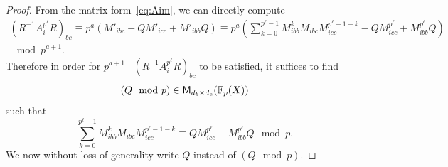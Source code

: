 \documentclass[letterpaper, 11pt, thm-restate]{article}
\numberwithin{equation}{section}
\newcommand{\F}{\mathbb{F}}
\newcommand{\M}{\mathsf{M}}
\newcommand{\oX}{\mkern 1.5mu\overline{\mkern-1.5mu X \mkern-1.5mu}\mkern 1.5mu}
\theoremstyle{definition}
\theoremstyle{definition}
\theoremstyle{definition}
\begin{document}
\begin{proof}
    From the matrix form~\eqref{eq:Aim}, we can directly compute
    \begin{multline*}
    \left(R^{-1} A_i^{p^{\ell}} R\right)_{bc} \equiv p^a\left(M'_{ibc} - Q M'_{icc} + M'_{ibb}Q\right) \equiv p^a \left(\sum_{k=0}^{p^{\ell}-1} M_{ibb}^k M_{ibc} M_{icc}^{p^{\ell}-1-k} - Q M_{icc}^{p^{\ell}} + M_{ibb}^{p^{\ell}} Q \right) \\
    \mod p^{a+1}.
    \end{multline*}
    Therefore in order for $p^{a+1} \mid \left(R^{-1} A_i^{p^{\ell}} R\right)_{bc}$ to be satisfied, it suffices to find 
    \[
    (Q \mod p) \in \M_{d_b \times d_c}(\F_p(\oX))
    \]
    such that 
    \begin{equation}\label{eq:solveQmat}
    \sum_{k=0}^{p^{\ell}-1} M_{ibb}^k M_{ibc} M_{icc}^{p^{\ell}-1-k} \equiv Q M_{icc}^{p^{\ell}} - M_{ibb}^{p^{\ell}} Q \mod p.
    \end{equation}
    We now without loss of generality write $Q$ instead of $(Q \mod p)$.
    

\end{proof}
\end{document}
